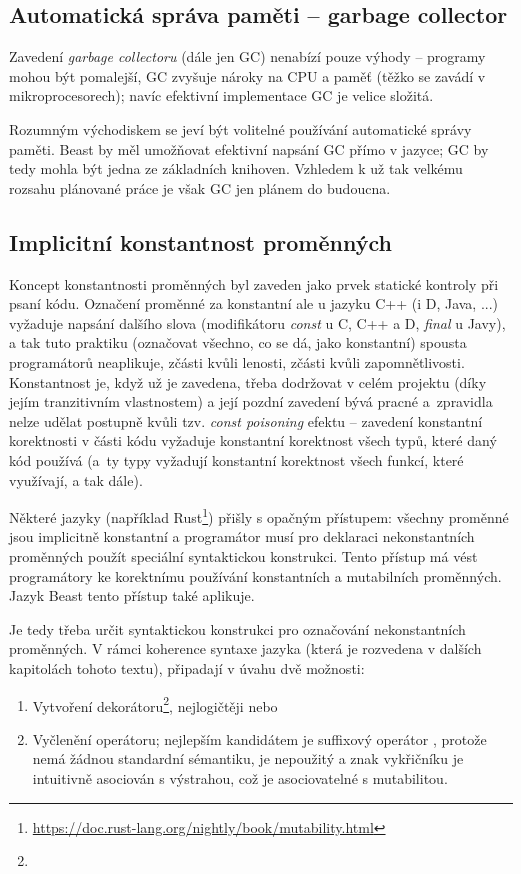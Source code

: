 \subsection{Automatická správa paměti -- garbage collector}
Zavedení \textit{garbage collectoru} (dále jen GC) nenabízí pouze výhody \cite{GarbageCollectionHarmful} -- programy mohou být pomalejší, GC zvyšuje nároky na CPU a paměť (těžko se zavádí v mikroprocesorech); navíc efektivní implementace GC je velice složitá.

Rozumným východiskem se jeví být volitelné používání automatické správy paměti. Beast by měl umožňovat efektivní napsání GC přímo v jazyce; GC by tedy mohla být jedna ze základních knihoven. Vzhledem k už tak velkému rozsahu plánované práce je však GC jen plánem do budoucna.

\subsection{Implicitní konstantnost proměnných} \label{implicitConst}
Koncept konstantnosti proměnných byl zaveden jako prvek statické kontroly při psaní kódu. Označení proměnné za konstantní ale u jazyku C++ (i D, Java, ...) vyžaduje napsání dalšího slova (modifikátoru \textit{const} u C, C++ a D, \textit{final} u Javy), a tak tuto praktiku (označovat všechno, co se dá, jako konstantní) spousta programátorů neaplikuje, zčásti kvůli lenosti, zčásti kvůli zapomnětlivosti. Konstantnost je, když už je zavedena, třeba dodržovat v celém projektu (díky jejím tranzitivním vlastnostem) a její pozdní zavedení bývá pracné a~zpravidla nelze udělat postupně kvůli tzv. \textit{const poisoning} efektu -- zavedení konstantní korektnosti \cite{ConstCorrectness}\cite{ConstCorrectness2} v části kódu vyžaduje konstantní korektnost všech typů, které daný kód používá (a~ty typy vyžadují konstantní korektnost všech funkcí, které využívají, a tak dále).

Některé jazyky (například Rust\footnote{\url{https://doc.rust-lang.org/nightly/book/mutability.html}}) přišly s opačným přístupem: všechny proměnné jsou implicitně konstantní a programátor musí pro deklaraci nekonstantních proměnných použít speciální syntaktickou konstrukci. Tento přístup má vést programátory ke korektnímu používání konstantních a mutabilních proměnných. Jazyk Beast tento přístup také aplikuje.

Je tedy třeba určit syntaktickou konstrukci pro označování nekonstantních proměnných. V rámci koherence syntaxe jazyka (která je rozvedena v dalších kapitolách tohoto textu), připadají  v úvahu dvě možnosti:
\begin{enumerate}
	\item Vytvoření dekorátoru\footnote{}, nejlogičtěji  nebo 
	\item Vyčlenění operátoru; nejlepším kandidátem je suffixový operátor , protože nemá žádnou standardní sémantiku, je nepoužitý a znak vykřičníku je intuitivně asociován s výstrahou, což je asociovatelné s mutabilitou.
\end{enumerate}


